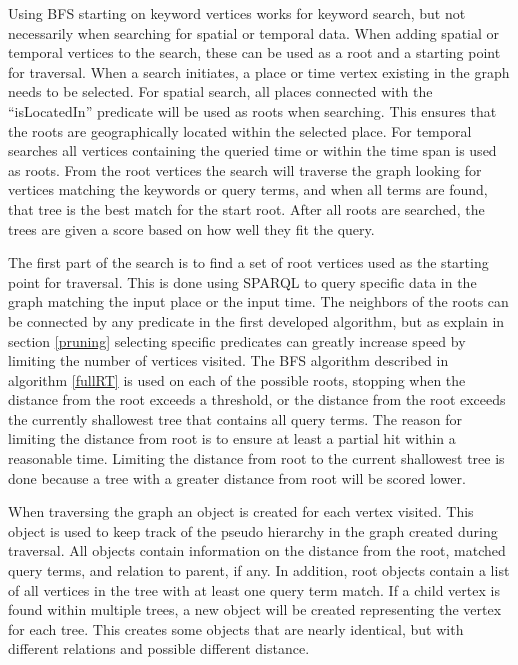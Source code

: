 Using BFS starting on keyword vertices works for keyword search, but not necessarily when searching for spatial or temporal data. When adding spatial or temporal vertices to the search, these can be used as a root and a starting point for traversal. When a search initiates, a place or time vertex existing in the graph needs to be selected. For spatial search, all places connected with the ``isLocatedIn'' predicate will be used as roots when searching. This ensures that the roots are geographically located within the selected place. For temporal searches all vertices containing the queried time or within the time span is used as roots. From the root vertices the search will traverse the graph looking for vertices matching the keywords or query terms, and when all terms are found, that tree is the best match for the start root. After all roots are searched, the trees are given a score based on how well they fit the query.

The first part of the search is to find a set of root vertices used as the starting point for traversal. This is done using SPARQL to query specific data in the graph matching the input place or the input time. The neighbors of the roots can be connected by any predicate in the first developed algorithm, but as explain in section \ref{pruning} selecting specific predicates can greatly increase speed by limiting the number of vertices visited. The BFS algorithm described in algorithm \ref{fullRT} is used on each of the possible roots, stopping when the distance from the root exceeds a threshold, or the distance from the root exceeds the currently shallowest tree that contains all query terms. The reason for limiting the distance from root is to ensure at least a partial hit within a reasonable time. Limiting the distance from root to the current shallowest tree is done because a tree with a greater distance from root will be scored lower.

When traversing the graph an object is created for each vertex visited. This object is used to keep track of the pseudo hierarchy in the graph created during traversal. All objects contain information on the distance from the root, matched query terms, and relation to parent, if any. In addition, root objects contain a list of all vertices in the tree with at least one query term match. If a child vertex is found within multiple trees, a new object will be created representing the vertex for each tree. This creates some objects that are nearly identical, but with different relations and possible different distance.

